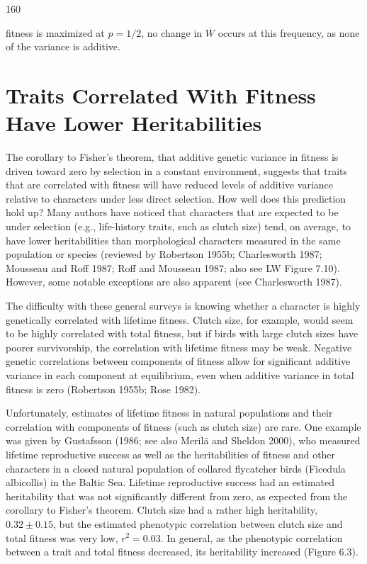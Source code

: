 \documentclass{article}
\begin{document}
160

fitness is maximized at  $ p = 1/2 $, no change in  $ \overline{W} $ occurs at this frequency, as none of the variance is additive.

\section{Traits Correlated With Fitness Have Lower Heritabilities}
The corollary to Fisher's theorem, that additive genetic variance in fitness is driven toward zero by selection in a constant environment, suggests that traits that are correlated with fitness will have reduced levels of additive variance relative to characters under less direct selection. How well does this prediction hold up? Many authors have noticed that characters that are expected to be under selection (e.g., life-history traits, such as clutch size) tend, on average, to have lower heritabilities than morphological characters measured in the same population or species (reviewed by Robertson 1955b; Charlesworth 1987; Mousseau and Roff 1987; Roff and Mousseau 1987; also see LW Figure 7.10). However, some notable exceptions are also apparent (see Charlesworth 1987).

The difficulty with these general surveys is knowing whether a character is highly genetically correlated with lifetime fitness. Clutch size, for example, would seem to be highly correlated with total fitness, but if birds with large clutch sizes have poorer survivorship, the correlation with lifetime fitness may be weak. Negative genetic correlations between components of fitness allow for significant additive variance in each component at equilibrium, even when additive variance in total fitness is zero (Robertson 1955b; Rose 1982).

Unfortunately, estimates of lifetime fitness in natural populations and their correlation with components of fitness (such as clutch size) are rare. One example was given by Gustafsson (1986; see also Merilä and Sheldon 2000), who measured lifetime reproductive success as well as the heritabilities of fitness and other characters in a closed natural population of collared flycatcher birds (Ficedula albicollis) in the Baltic Sea. Lifetime reproductive success had an estimated heritability that was not significantly different from zero, as expected from the corollary to Fisher's theorem. Clutch size had a rather high heritability,  $ 0.32 \pm 0.15 $, but the estimated phenotypic correlation between clutch size and total fitness was very low,  $ r^2 = 0.03 $. In general, as the phenotypic correlation between a trait and total fitness decreased, its heritability increased (Figure 6.3).
\end{document}
